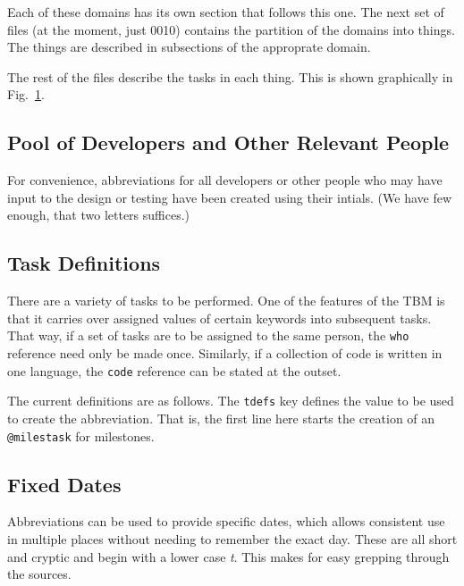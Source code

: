 Each of these domains has its own section that follows this one.
The next set of files (at the moment, just 0010) contains the partition
of the domains into things.  The things are described in subsections of
the approprate domain.

The rest of the files describe the tasks in each thing.  This is shown
graphically in Fig.~\ref{fig:umlclass}.
\begin{figure}[h!]%
\captionsetup{width=0.6\linewidth}
\label{fig:umlclass}
\end{figure}

\subsection{Pool of Developers and Other Relevant People}

For convenience, abbreviations for all developers or other people who
may have input to the design or testing have been created using their
intials.   (We have few enough, that two letters suffices.)


\subsection{Task Definitions}

There are a variety of tasks to be performed.  One of the features
of the \ac{TBM} is that it carries over assigned values of certain
keywords into subsequent tasks.  That way, if a set of tasks are to
be assigned to the same person, the \texttt{who} reference need only
be made once.  Similarly, if a collection of code is written in one
language, the \texttt{code} reference can be stated at the outset.

The current definitions are as follows.  The \texttt{tdefs} key
defines the value to be used to create the abbreviation.  That is,
the first line here starts the creation of an \texttt{@milestask}
for milestones.


\subsection{Fixed Dates}

Abbreviations can be used to provide specific dates, which allows
consistent use in multiple places without needing to remember the
exact day.  These are all short and cryptic and begin with a lower
case \textit{t}.  This makes for easy grepping through the sources.


%
%
